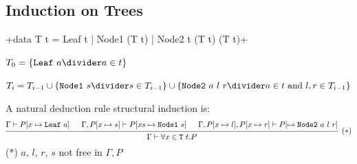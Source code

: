 \subsection{Induction on Trees}
+data T t = Leaf t | Node1 (T t) | Node2 t (T t) (T t)+

 $T_0 = \{ \texttt{Leaf}\ a \divider a \in t \}$

 $T_i = T_{i - 1} \cup \{ \texttt{Node1}\ s \divider s \in T_{i - 1} \} \cup \{ \texttt{Node2}\ a\ l\ r \divider a \in t \text{ and } l, r \in T_{i - 1} \}$

A natural deduction rule structural induction is:
\[
    \begin{prooftree}
        \hypo{\Gamma \vdash P[x \mapsto \texttt{Leaf}\ a]}
        \hypo{\Gamma, P[x \mapsto s] \vdash P[xs \mapsto \texttt{Node1}\ s]}
        \hypo{\Gamma, P[x \mapsto l], P[x \mapsto r] \vdash P[ \mapsto \texttt{Node2}\ a\ l\ r]}
        \infer3[$(*)$]{\Gamma \vdash \forall x \in \texttt{T}\ t. P}
    \end{prooftree}
\]
(*) $a$, $l$, $r$, $s$ not free in $\Gamma, P$
